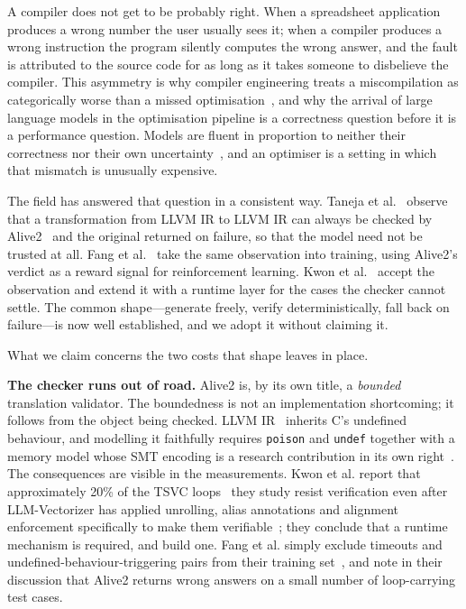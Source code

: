 \documentclass[conference]{IEEEtran}
\begin{document}
A compiler does not get to be probably right. When a spreadsheet application
produces a wrong number the user usually sees it; when a compiler produces a
wrong instruction the program silently computes the wrong answer, and the fault
is attributed to the source code for as long as it takes someone to disbelieve
the compiler. This asymmetry is why compiler engineering treats a
miscompilation as categorically worse than a missed
optimisation~\cite{deadcode}, and why the
arrival of large language models in the optimisation pipeline is a correctness
question before it is a performance question. Models are fluent in proportion
to neither their correctness nor their own uncertainty~\cite{hallucination},
and an optimiser is a setting in which that mismatch is unusually expensive.

The field has answered that question in a consistent way. Taneja et
al.~\cite{llmvectorizer} observe that a transformation from LLVM IR to LLVM IR
can always be checked by Alive2~\cite{alive2} and the original returned on
failure, so that the model need not be trusted at all. Fang et
al.~\cite{llmveriopt} take the same observation into training, using Alive2's
verdict as a reward signal for reinforcement learning. Kwon et
al.~\cite{cov} accept the observation and extend it with a runtime layer for
the cases the checker cannot settle. The common shape---generate freely,
verify deterministically, fall back on failure---is now well established, and
we adopt it without claiming it.

What we claim concerns the two costs that shape leaves in place.

\textbf{The checker runs out of road.} Alive2 is, by its own title, a
\emph{bounded} translation validator. The boundedness is not an implementation
shortcoming; it follows from the object being checked. LLVM IR~\cite{llvm}
inherits C's undefined behaviour, and modelling it faithfully requires
\texttt{poison} and \texttt{undef} together with a memory model whose SMT
encoding is a research contribution in its own right~\cite{smtmemory}. The consequences are visible in
the measurements. Kwon et al. report that approximately 20\% of the TSVC
loops~\cite{tsvc} they study resist verification even after LLM-Vectorizer has
applied unrolling, alias annotations and alignment enforcement specifically to
make them verifiable~\cite{cov}; they conclude that a runtime mechanism is
required, and build one. Fang et al. simply exclude timeouts and
undefined-behaviour-triggering pairs from their training set~\cite{llmveriopt},
and note in their discussion that Alive2 returns wrong answers on a small
number of loop-carrying test cases.
\end{document}
